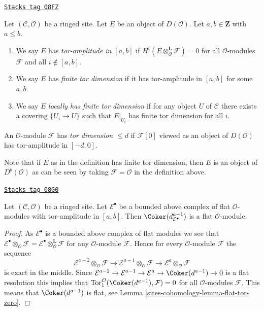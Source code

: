\begin{definition}
\label{sites-cohomology-definition-tor-amplitude}
\href{https://stacks.math.columbia.edu/tag/08FZ}{\texttt{Stacks tag 08FZ}}

Let $(\mathcal{C}, \mathcal{O})$ be a ringed site.
Let $E$ be an object of $D(\mathcal{O})$.
Let $a, b \in \mathbf{Z}$ with $a \leq b$.
\begin{enumerate}
\item We say $E$ has {\it tor-amplitude in $[a, b]$}
if $H^i(E \otimes_\mathcal{O}^\mathbf{L} \mathcal{F}) = 0$
for all $\mathcal{O}$-modules $\mathcal{F}$ and all $i \not \in [a, b]$.
\item We say $E$ has {\it finite tor dimension}
if it has tor-amplitude in $[a, b]$ for some $a, b$.
\item We say $E$ {\it locally has finite tor dimension} if for any
object $U$ of $\mathcal{C}$ there exists a covering $\{U_i \to U\}$
such that $E|_{U_i}$ has finite tor dimension for all $i$.
\end{enumerate}
An $\mathcal{O}$-module $\mathcal{F}$ has {\it tor dimension $\leq d$}
if $\mathcal{F}[0]$ viewed as an object of $D(\mathcal{O})$ has
tor-amplitude in $[-d, 0]$.
\end{definition}

Note that if $E$ as in the definition
has finite tor dimension, then $E$ is an object of
$D^b(\mathcal{O})$ as can be seen by taking $\mathcal{F} = \mathcal{O}$
in the definition above.

\begin{lemma}
\label{sites-cohomology-lemma-last-one-flat}
\href{https://stacks.math.columbia.edu/tag/08G0}{\texttt{Stacks tag 08G0}}

Let $(\mathcal{C}, \mathcal{O})$ be a ringed site.
Let $\mathcal{E}^\bullet$ be a bounded above complex of flat
$\mathcal{O}$-modules with tor-amplitude in $[a, b]$.
Then $\Coker(d_{\mathcal{E}^\bullet}^{a - 1})$ is a flat
$\mathcal{O}$-module.
\end{lemma}

\begin{proof}
As $\mathcal{E}^\bullet$ is a bounded above complex of flat modules we see that
$\mathcal{E}^\bullet \otimes_\mathcal{O} \mathcal{F} =
\mathcal{E}^\bullet \otimes_\mathcal{O}^{\mathbf{L}} \mathcal{F}$
for any $\mathcal{O}$-module $\mathcal{F}$.
Hence for every $\mathcal{O}$-module $\mathcal{F}$ the sequence
$$
\mathcal{E}^{a - 2} \otimes_\mathcal{O} \mathcal{F} \to
\mathcal{E}^{a - 1} \otimes_\mathcal{O} \mathcal{F} \to
\mathcal{E}^a \otimes_\mathcal{O} \mathcal{F}
$$
is exact in the middle. Since
$\mathcal{E}^{a - 2} \to \mathcal{E}^{a - 1} \to \mathcal{E}^a \to
\Coker(d^{a - 1}) \to 0$
is a flat resolution this implies that
$\text{Tor}_1^\mathcal{O}(\Coker(d^{a - 1}), \mathcal{F}) = 0$
for all $\mathcal{O}$-modules $\mathcal{F}$. This means that
$\Coker(d^{a - 1})$ is flat, see Lemma \ref{sites-cohomology-lemma-flat-tor-zero}.
\end{proof}


